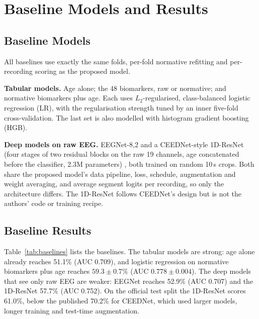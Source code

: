 \section{Baseline Models and Results}

\subsection{Baseline Models}
All baselines use exactly the same folds, per-fold normative refitting and per-recording scoring as the
proposed model.

\textbf{Tabular models.} Age alone; the 48 biomarkers, raw or normative; and normative biomarkers plus age.
Each uses $L_2$-regularised, class-balanced logistic regression (LR), with the regularisation strength tuned by
an inner five-fold cross-validation. The last set is also modelled with histogram gradient boosting (HGB).

\textbf{Deep models on raw EEG.} EEGNet-8,2 \citep{lawhern2018eegnet} and a CEEDNet-style 1D-ResNet (four stages
of two residual blocks on the raw 19 channels, age concatenated before the classifier, 2.3M parameters)
\citep{kim2023caueeg}, both trained on random 10\,s crops. Both share the proposed model's data pipeline,
loss, schedule, augmentation and weight averaging, and average segment logits per recording, so only the
architecture differs. The 1D-ResNet follows CEEDNet's design but is not the authors' code or training recipe.

\subsection{Baseline Results}
Table~\ref{tab:baselines} lists the baselines. The tabular models are strong: age alone already reaches
51.1\% (AUC 0.709), and logistic regression on normative biomarkers plus age reaches $59.3\pm0.7\%$ (AUC
$0.778\pm0.004$). The deep models that see only raw EEG are weaker: EEGNet reaches 52.9\% (AUC 0.707) and the
1D-ResNet 57.7\% (AUC 0.752). On the official test split the 1D-ResNet scores 61.0\%, below the published
70.2\% for CEEDNet, which used larger models, longer training and test-time augmentation.


